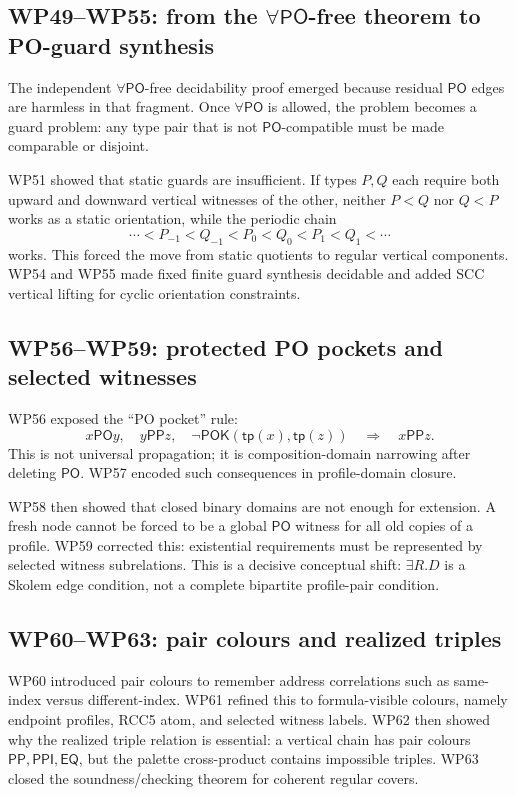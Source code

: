 \documentclass[11pt]{article}
\newcommand{\EQ}{\mathsf{EQ}}
\newcommand{\PP}{\mathsf{PP}}
\newcommand{\PPI}{\mathsf{PPI}}
\newcommand{\PO}{\mathsf{PO}}
\newcommand{\tp}{\mathsf{tp}}
\newcommand{\POK}{\mathsf{POK}}
\begin{document}
\subsection{WP49--WP55: from the $\forall\PO$-free theorem to PO-guard synthesis}

The independent $\forall\PO$-free decidability proof emerged because residual $\PO$ edges are harmless in that fragment.  Once $\forall\PO$ is allowed, the problem becomes a guard problem: any type pair that is not $\PO$-compatible must be made comparable or disjoint.

WP51 showed that static guards are insufficient.  If types $P,Q$ each require both upward and downward vertical witnesses of the other, neither $P<Q$ nor $Q<P$ works as a static orientation, while the periodic chain
\[
\cdots<P_{-1}<Q_{-1}<P_0<Q_0<P_1<Q_1<\cdots
\]
works.  This forced the move from static quotients to regular vertical components.  WP54 and WP55 made fixed finite guard synthesis decidable and added SCC vertical lifting for cyclic orientation constraints.

\subsection{WP56--WP59: protected PO pockets and selected witnesses}

WP56 exposed the ``PO pocket'' rule:
\[
 x\PO y,
 \quad y\PP z,
 \quad \neg\POK(\tp(x),\tp(z))
 \quad\Rightarrow\quad x\PP z.
\]
This is not universal propagation; it is composition-domain narrowing after deleting $\PO$.  WP57 encoded such consequences in profile-domain closure.

WP58 then showed that closed binary domains are not enough for extension.  A fresh node cannot be forced to be a global $\PO$ witness for all old copies of a profile.  WP59 corrected this: existential requirements must be represented by selected witness subrelations.  This is a decisive conceptual shift: $\exists R.D$ is a Skolem edge condition, not a complete bipartite profile-pair condition.

\subsection{WP60--WP63: pair colours and realized triples}

WP60 introduced pair colours to remember address correlations such as same-index versus different-index.  WP61 refined this to formula-visible colours, namely endpoint profiles, RCC5 atom, and selected witness labels.  WP62 then showed why the realized triple relation is essential: a vertical chain has pair colours $\PP,\PPI,\EQ$, but the palette cross-product contains impossible triples.  WP63 closed the soundness/checking theorem for coherent regular covers.
\end{document}
